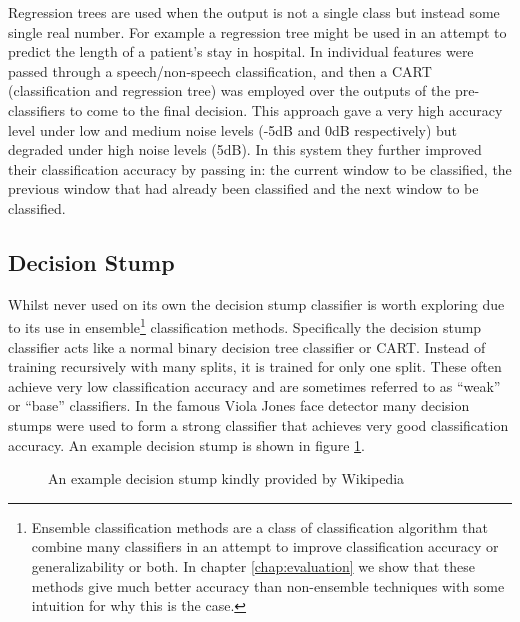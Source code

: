 \documentclass[ %
                    author={Sam Phippen},
                supervisor={Dr. Rafal Bogacz},
                     title={Real time voice activity detectors in noisy personal computing environments},
                  subtitle={},
                    degree={MEng},
                      year={2012} ]{thesis}
\begin{document}
Regression trees are used when the output is not a single class but instead
some single real number. For example a regression tree might be used in an
attempt to predict the length of a patient's stay in hospital. In \cite{shin}
individual features were passed through a speech/non-speech classification, and
then a CART (classification and regression tree) was employed over the outputs
of the pre-classifiers to come to the final decision. This approach gave a very
high accuracy level under low and medium noise levels (-5dB and 0dB
respectively) but degraded under high noise levels (5dB). In this system they
further improved their classification accuracy by passing in: the current window
to be classified, the previous window that had already been classified and the
next window to be classified.

\subsection{Decision Stump}

Whilst never used on its own the decision stump classifier is worth exploring
due to its use in ensemble\footnote{Ensemble classification methods are a class
    of classification algorithm that combine many classifiers in an attempt to
    improve classification accuracy or generalizability or both. In chapter
\ref{chap:evaluation} we show that these methods give much better accuracy than
non-ensemble techniques with some intuition for why this is the case.}
classification methods. Specifically the decision stump classifier acts like a
normal binary decision tree classifier or CART. Instead of training recursively
with many splits, it is trained for only one split. These often achieve very
low classification accuracy and are sometimes referred to as ``weak'' or ``base''
classifiers. In the famous Viola Jones face detector\cite{viola} many decision
stumps were used to form a strong classifier that achieves very good
classification accuracy. An example decision stump is shown in figure
\ref{fig:decision-stump}.

\begin{figure}



    \caption{An example decision stump kindly provided by Wikipedia}
    \label{fig:decision-stump}
\end{figure}
\end{document}
